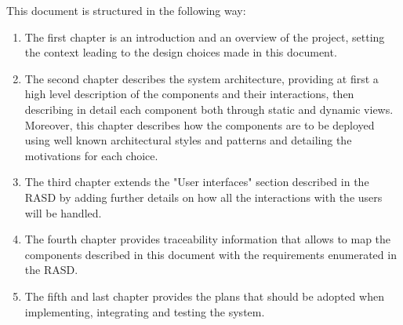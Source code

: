 \documentclass[../../main.tex]{subfiles}
\begin{document}
This document is structured in the following way:

\begin{enumerate}
    \item The first chapter is an introduction and an overview of the project, setting the context leading to the design choices made in this document.

    \item The second chapter describes the system architecture, providing at first a high level description of the components and their interactions, then describing in detail each component both through static and dynamic views. Moreover, this chapter describes how the components are to be deployed using well known architectural styles and patterns and detailing the motivations for each choice.

    \item The third chapter extends the "User interfaces" section described in the RASD by adding further details on how all the interactions with the users will be handled.
    
    \item The fourth chapter provides traceability information that allows to map the components described in this document with the requirements enumerated in the RASD.
    
    \item The fifth and last chapter provides the plans that should be adopted when implementing, integrating and testing the system.
    
\end{enumerate}
\end{document}
